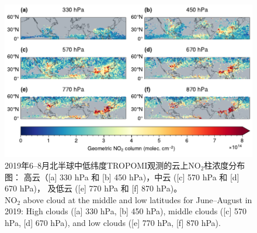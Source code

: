 \begin{figure}[!htbp]
    \centering
    \includegraphics[width=15cm]{./figures/no2geo_tropomi.pdf}
    \caption{
    2019年6--8月北半球中低纬度TROPOMI观测的云上NO$_2$柱浓度分布图：
    高云（[a] 330 hPa 和 [b] 450 hPa)，中云 ([c] 570 hPa 和 [d] 670 hPa)，
    及低云 ([e] 770 hPa 和 [f] 870 hPa)。 \\
    NO$_2$ above cloud at the middle and low latitudes for June--August in 2019:
    High clouds ([a] 330 hPa, [b] 450 hPa), middle clouds ([c] 570 hPa, [d] 670 hPa),
    and low clouds ([e] 770 hPa, [f] 870 hPa).
    }
    \label{fig:no2geo_tropomi}
\end{figure}


